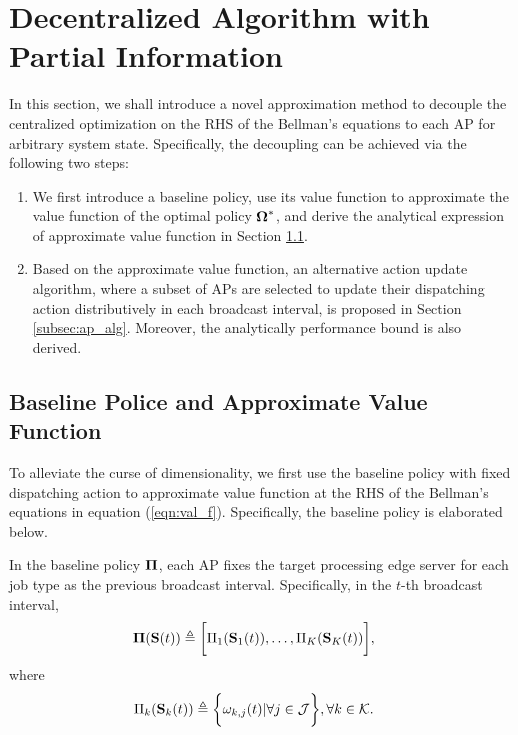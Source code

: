 \section{Decentralized Algorithm with Partial Information}
\label{sec:algorithm}

In this section, we shall introduce a novel approximation method to decouple the centralized optimization on the RHS of the Bellman's equations to each AP for arbitrary system state.
Specifically, the decoupling can be achieved via the following two steps:
\begin{enumerate}
    \item We first introduce a baseline policy, use its value function to approximate the value function of the optimal policy $\boldsymbol{\Omega}^*$, and derive the analytical expression of approximate value function in Section \ref{subsec:baseline}.
    \item Based on the approximate value function, an alternative action update algorithm, where a subset of APs are selected to update their dispatching action distributively in each broadcast interval, is proposed in Section \ref{subsec:ap_alg}.
    Moreover, the analytically performance bound is also derived.
\end{enumerate}

\subsection{Baseline Police and Approximate Value Function}
\label{subsec:baseline}
To alleviate the curse of dimensionality, we first use the baseline policy with fixed dispatching action to approximate value function at the RHS of the Bellman's equations in equation (\ref{eqn:val_f}).
Specifically, the baseline policy is elaborated below.

\begin{policy}
    In the baseline policy $\boldsymbol{\Pi}$, each AP fixes the target processing edge server for each job type as the previous broadcast interval. Specifically, in the $t$-th broadcast interval,
    \begin{align}
        \boldsymbol{\Pi}(\mathbf{S}(t)) &\triangleq \bigg[ \Pi_{1}(\mathbf{S}_{1}(t)), \dots, \Pi_{K}(\mathbf{S}_{K}(t)) \bigg],
    \end{align}
    where 
    \begin{align}
        \Pi_{k}(\mathbf{S}_{k}(t)) &\triangleq \bigg\{
            \omega_{k,j}(t) | \forall j\in\mathcal{J}
        \bigg\}, \forall k\in\mathcal{K}.
    \end{align}
\end{policy}

